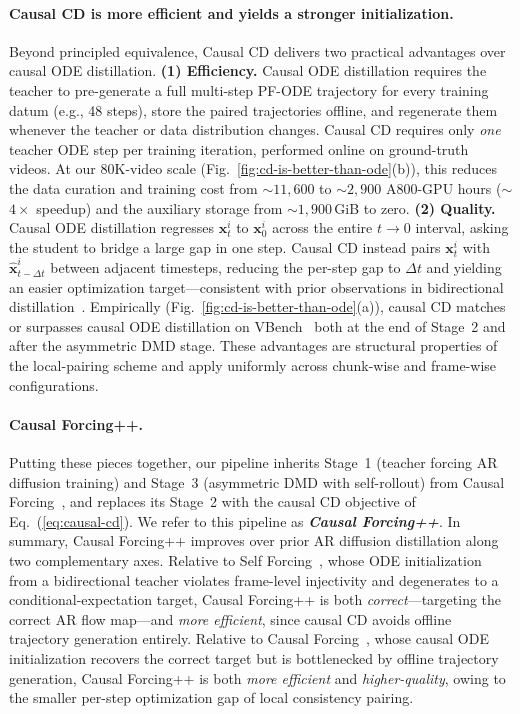 \documentclass{llmxive}
\providecommand{\bm}[1]{\boldsymbol{#1}}
\providecommand{\vx}{{\bm{x}}}
\begin{document}
\paragraph{Causal CD is more efficient and yields a stronger initialization.} Beyond principled equivalence, Causal CD delivers two practical advantages over causal ODE distillation. \textbf{(1) Efficiency.} 
Causal ODE distillation requires the teacher to pre-generate a full multi-step PF-ODE trajectory for every training datum (e.g., 48 steps), store the paired trajectories offline, and regenerate them whenever the teacher or data distribution changes. Causal CD requires only \emph{one} teacher ODE step per training iteration, performed online on ground-truth videos. At our 80K-video scale (Fig.~\ref{fig:cd-is-better-than-ode}(b)), this reduces the data curation and training cost from $\sim$$11{,}600$ to $\sim$$2{,}900$ A800-GPU hours ($\sim$$4\times$ speedup) and the auxiliary storage from $\sim$$1{,}900$\,GiB to zero. \textbf{(2) Quality.} Causal ODE distillation regresses $\vx_t^i$ to $\vx_0^i$ across the entire $t \to 0$ interval, asking the student to bridge a large gap in one step. Causal CD instead pairs $\vx_t^i$ with $\hat{\vx}^i_{t-\Delta t}$ between adjacent timesteps, reducing the per-step gap to $\Delta t$ and yielding an easier optimization target---consistent with prior observations in bidirectional distillation~\cite{liu2023instaflow}. Empirically (Fig.~\ref{fig:cd-is-better-than-ode}(a)), causal CD matches or surpasses causal ODE distillation on VBench~\cite{huang2024vbench} both at the end of Stage~2 and after the asymmetric DMD stage. These advantages are structural properties of the local-pairing scheme and apply uniformly across chunk-wise and frame-wise configurations.

\paragraph{Causal Forcing++.} Putting these pieces together, our pipeline inherits Stage~1 (teacher forcing AR diffusion training) and Stage~3 (asymmetric DMD with self-rollout) from Causal Forcing~\cite{zhu2026causal}, and replaces its Stage~2 with the causal CD objective of Eq.~(\ref{eq:causal-cd}). We refer to this pipeline as \textbf{\textit{Causal Forcing++}}. In summary, Causal Forcing++ improves over prior AR diffusion distillation along two complementary axes. Relative to Self Forcing~\cite{huang2025self}, whose ODE initialization from a bidirectional teacher violates frame-level injectivity and degenerates to a conditional-expectation target, Causal Forcing++ is both \emph{correct}---targeting the correct AR flow map---and \emph{more efficient}, since causal CD avoids offline trajectory generation entirely. Relative to Causal Forcing~\cite{zhu2026causal}, whose causal ODE initialization recovers the correct target but is bottlenecked by offline trajectory generation, Causal Forcing++ is both \emph{more efficient} and \emph{higher-quality}, owing to the smaller per-step optimization gap of local consistency pairing.
\end{document}
